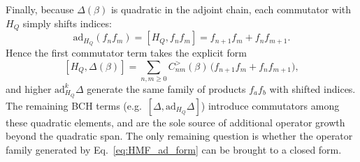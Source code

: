 Finally, because $\Delta(\beta)$ is quadratic in the adjoint chain, each commutator with $H_Q$ simply shifts indices:
\begin{equation}
    \label{eq:adHQ_on_products}
    \mathrm{ad}_{H_Q}(f_n f_m)=[H_Q,f_n f_m]=f_{n+1}f_m+f_n f_{m+1}.
\end{equation}
Hence the first commutator term takes the explicit form
\begin{equation}
    \label{eq:adHQ_Delta_explicit}
    [H_Q,\Delta(\beta)]
    =\sum_{n,m\ge0}C^{>}_{nm}(\beta)\,\big(f_{n+1}f_m+f_n f_{m+1}\big),
\end{equation}
and higher $\mathrm{ad}_{H_Q}^k\Delta$ generate the same family of products $f_a f_b$ with shifted indices.
The remaining BCH terms (e.g.\ $[\Delta,\mathrm{ad}_{H_Q}\Delta]$) introduce commutators among these quadratic
elements, and are the sole source of additional operator growth beyond the quadratic span.
The only remaining question is whether the operator family generated by Eq.~\eqref{eq:HMF_ad_form} can be brought to a closed form.

